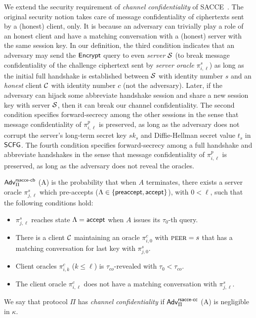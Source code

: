 \begin{remark}
We extend the security requirement of
\textit{channel confidentiality} of SACCE~\cite{KPW13:SACCE}.
The original security notion takes care of message
confidentiality of ciphertexts sent by a (honest)
client, only. It is because an adversary can trivially
play a role of an honest client and have a matching
conversation with a (honest) server with the same
session key. In our definition, the third condition
indicates that an adversary may send the $\mathsf{Encrypt}$
query to even \textit{server} $\mathcal{S}$ (to break
message confidentiality of the challenge ciphertext
sent by \textit{server oracle} $\pi^s_{i,\ell}$) as
long as the initial full handshake is established
between $\mathcal{S}$ with identity number $s$ and an \textit{honest} client
$\mathcal{C}$ with identity number $c$ (not the adversary). Later, if the
adversary can hijack some abbreviate handshake session
and share a new session key with server $\mathcal{S}$,
then it can break our channel confidentiality.
The second condition specifies forward-secrecy among
the other sessions in the
sense that message confidentiality of $\pi^p_{i,\ell}$
is preserved, as long as the adversary does not
corrupt the server's long-term secret key $sk_s$ and Diffie-Hellman
secret value $t_s$ in $\mathsf{SCFG}$.
The fourth condition specifies forward-secrecy among
a full handshake and abbreviate handshakes in the sense
that message confidentiality of $\pi^p_{i,\ell}$ is preserved,
as long as the adversary does not reveal the oracles.
\end{remark}

\begin{definition} \label{def:rsacce-cb}
 $\mathsf{Adv}^{\mathsf{rsacce\textsc{-} cb}}_{\Pi}$ (A) is the probability that when $A$
 terminates, there exists a server oracle $\pi^s_{j, \ell}$
 which pre-accepts ($\Lambda \in \{\mathsf{preaccept}, \mathsf{accept} \}$), with
 $0< \ell$, such that the following conditions hold:

 \begin{itemize}
  \item{$\pi^s_{j,\ell}$ reaches state $\Lambda=\mathsf{accept}$ when $A$ issues
  its $\tau_0$-th query.}

  \item{There is a client $\mathcal{C}$ maintaining an oracle $\pi^c_{i,0}$ with $\textsc{peer}=s$
  that has a matching conversation for last key with $\pi^s_{j,0}$.}

  \item{Client oracles $\pi^c_{i,k}$
  ($k \leq \ell$) is $\tau_{co}$-revealed with $\tau_0 < \tau_{co}$.}

  \item{The client oracle $\pi^c_{i, \ell}$ does not have a matching conversation
  with $\pi^s_{j,\ell}$.}

 \end{itemize}
 We say that protocol $\Pi$ has \textit{channel confidentiality}
 if $\mathsf{Adv}^{\mathsf{rsacce\textsc{-} cc}}_{\Pi}$ (A) is negligible in $\kappa$.
\end{definition}

